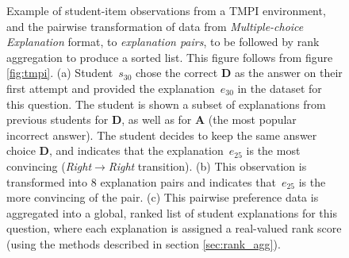 \documentclass[notitlepage,12pt]{jedm}
\begin{document}



\begin{figure}
	\centering
	\def\svgscale{0.40}
	
	\caption{
	Example of student-item observations from a TMPI environment, and the 
	pairwise transformation of data from \textit{Multiple-choice Explanation} 
	format, to \textit{explanation pairs}, to be followed by rank aggregation 
	to produce a sorted list. 
	This figure follows from figure \protect\ref{fig:tmpi}.
	(a) Student~$s_{30}$ chose the correct \textbf{D} as the answer on 
	their first attempt and provided the explanation~$e_{30}$ in the 
	dataset for this question. 
	The student is shown a subset of explanations from previous students for 
	\textbf{D}, as well as for \textbf{A} (the most popular incorrect 
	answer). 
	The student decides to keep the same answer choice \textbf{D}, and 
	indicates that the explanation~$e_{25}$ is the most convincing (\textit{Right}$\rightarrow$\textit{Right} 
	transition).
	(b) This observation is transformed into 8 explanation pairs and indicates
	that~$e_{25}$ is the more convincing of the pair. 
	(c) This pairwise preference data is aggregated into a global, ranked list 
	of student explanations for this question, where each explanation is 
	assigned a real-valued rank score (using the methods described in section 
	\protect\ref{sec:rank_agg}).
}
\label{fig:make_pairs_a}
\end{figure}
\end{document}
